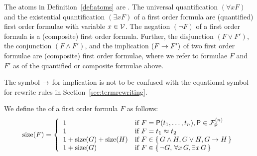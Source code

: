 
\begin{definition}[\FOF]\label{def:syntax:FOF}
	The atoms in Definition~\vref{def:atoms} are .
	The universal quantification \( (\forall x F) \)
	and the existential quantification \( (\exists x F) \)
	of a first order formula are (quantified) first order formulae
	with  variable \( x\in\mcV \).
	The negation \( (\lnot F) \) of a first order formula
	is a (composite) first order formula.
	Further, the disjunction \( (F \lor F') \),
	the conjunction \( (F \land F')  \),
	and the implication \( (F \limp F') \)
	of two first order formulae
	are (composite) first order formulae, where 
%
	we refer to formulae \(F \) and \( F' \) as  of
	the quantified or composite formulae above.
\end{definition}

\begin{remark}
	The symbol \( \limp \) for implication is not to be confused
	with the equational symbol for rewrite rules in Section~\ref{sec:termrewriting}.
\end{remark}

\begin{definition}
	We define the  of a first order formula \( F \) as follows:
\begin{gather*}
	\MDEFINE{\size(F)}{ll}{
		1
		&\text{if }F
		= \mP(t_1,\ldots,t_n), \mP\in\mcFPn
		\\
		1
		&\text{if }F
		= t_1\mEQ t_2
		\\
		1 + \size(G) + \size(H)&\text{if }F \in \{ \, G\land H,G \lor H,G\limp H \, \}
		\\
		1 + \size (G) &\text{if } F \in \{ \, \lnot G, \, \forall x \, G, \exists x \, G \, \}
	}
\end{gather*}
\end{definition}

